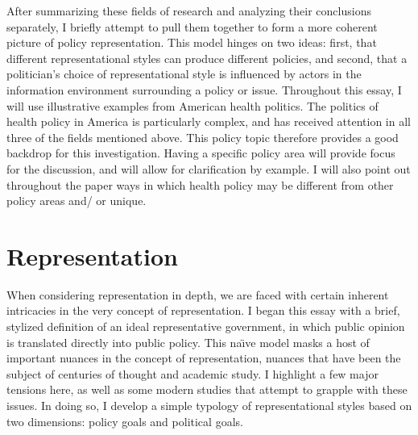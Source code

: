 After summarizing these fields of research and analyzing their conclusions separately, I briefly attempt to pull them together to form a more coherent picture of policy representation. This model hinges on two ideas: first, that different representational styles can produce different policies, and second, that a politician's choice of representational style is influenced by actors in the information environment surrounding a policy or issue. Throughout this essay, I will use illustrative examples from American health politics. The politics of health policy in America is particularly complex, and has received attention in all three of the fields mentioned above. This policy topic therefore provides a good backdrop for this investigation. Having a specific policy area will provide focus for the discussion, and will allow for clarification by example. I will also point out throughout the paper ways in which health policy may be different from other policy areas and/ or unique.

\section*{Representation}

When considering representation in depth, we are faced with certain inherent intricacies in the very concept of representation. I began this essay with a brief, stylized definition of an ideal representative government, in which public opinion is translated directly into public policy. This na\"{\i}ve model masks a host of important nuances in the concept of representation, nuances that have been the subject of centuries of thought and academic study. I highlight a few major tensions here, as well as some modern studies that attempt to grapple with these issues. In doing so, I develop a simple typology of representational styles based on two dimensions: policy goals and political goals.

